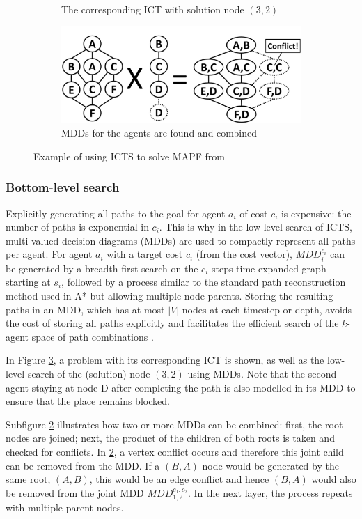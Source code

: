 \documentclass[english]{article}
\begin{document}
\begin{figure}[b]
\begin{subfigure}{0.3\textwidth}
			\caption{The corresponding ICT with solution node $(3,2)$}
			\label{fig:ict2}
		\end{subfigure}
		\hfill
		\begin{subfigure}{0.4\textwidth}
			\centering
			\includegraphics[width=\linewidth]{img/mdds}
			\caption{MDDs for the agents are found and combined}
			\label{fig:mdds}
		\end{subfigure}
		
		\caption{Example of using ICTS to solve MAPF from \cite{sharon2011}}
		\label{fig:bottom}
	\end{figure}
	\subsubsection{Bottom-level search}
	Explicitly generating all paths to the goal for agent $a_i$ of cost $c_i$ is expensive: the number of paths is exponential in $c_i$. This is why in the low-level search of ICTS, multi-valued decision diagrams (MDDs) are used to compactly represent all paths per agent. For agent $a_i$ with a target cost $c_i$ (from the cost vector), $MDD_i^{c_i}$ can be generated by a breadth-first search on the $c_i$-steps time-expanded graph starting at $s_i$, followed by a process similar to the standard path reconstruction method used in A* but allowing multiple node parents. Storing the resulting paths in an MDD, which has at most $|V|$ nodes at each timestep or depth, avoids the cost of storing all paths explicitly and facilitates the efficient search of the $k$-agent space of path combinations \cite{sharon2011}.
	
	In Figure \ref{fig:bottom}, a problem with its corresponding ICT is shown, as well as the low-level search of the (solution) node $(3,2)$ using MDDs. Note that the second agent staying at node D after completing the path is also modelled in its MDD to ensure that the place remains blocked.
	
	Subfigure \ref{fig:mdds} illustrates how two or more MDDs can be combined: first, the root nodes are joined; next, the product of the children of both roots is taken and checked for conflicts. In \ref{fig:mdds}, a vertex conflict occurs and therefore this joint child can be removed from the MDD. If a $(B,A)$ node would be generated by the same root, $(A,B)$, this would be an edge conflict and hence $(B,A)$ would also be removed from the joint MDD $MDD_{1,2}^{c_1,c_2}$. In the next layer, the process repeats with multiple parent nodes.
	
\end{document}
